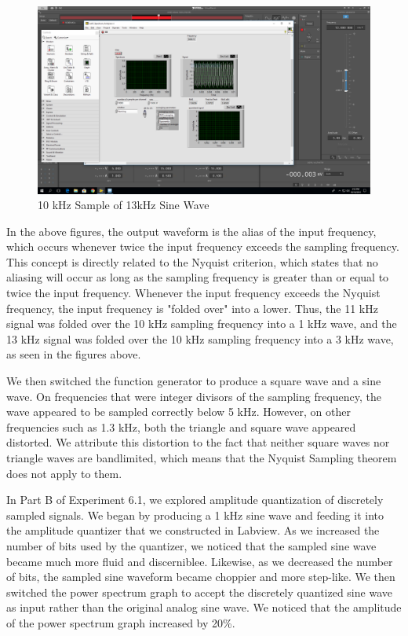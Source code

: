 \documentclass[10pt]{article}
\begin{document}
\begin{centering}
	\begin{figure} [H]
		\centering
		\includegraphics[scale=0.22]{images/51a13000input3000measured.PNG}
		\caption{10 kHz Sample of 13kHz Sine Wave}
		\label{fig:13khz}
	\end{figure}
\end{centering}

In the above figures, the output waveform is the alias of the input frequency, which occurs whenever twice the input frequency exceeds the sampling frequency. This concept is directly related to the Nyquist criterion, which states that no aliasing will occur as long as the sampling frequency is greater than or equal to twice the input frequency. Whenever the input frequency exceeds the Nyquist frequency, the input frequency is "folded over" into a lower. Thus, the 11 kHz signal was folded over the 10 kHz sampling frequency into a 1 kHz wave, and the 13 kHz signal was folded over the 10 kHz sampling frequency into a 3 kHz wave, as seen in the figures above. 

We then switched the function generator to produce a square wave and a sine wave. On frequencies that were integer divisors of the sampling frequency, the wave appeared to be sampled correctly below 5 kHz. However, on other frequencies such as 1.3 kHz, both the triangle and square wave appeared distorted. We attribute this distortion to the fact that neither square waves nor triangle waves are bandlimited, which means that the Nyquist Sampling theorem does not apply to them.


In Part B of Experiment 6.1, we explored amplitude quantization of discretely sampled signals. We began by producing a 1 kHz sine wave and feeding it into the amplitude quantizer that we constructed in Labview. As we increased the number of bits used by the quantizer, we noticed that the sampled sine wave became much more fluid and discerniblee. Likewise, as we decreased the number of bits, the sampled sine waveform became choppier and more step-like. We then switched the power spectrum graph to accept the discretely quantized sine wave as input rather than the original analog sine wave. We noticed that the amplitude of the power spectrum graph increased by 20\%. 
\end{document}
